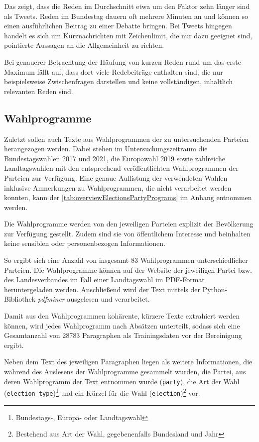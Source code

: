 Das zeigt, dass die Reden im Durchschnitt etwa um den Faktor zehn länger sind als Tweets. Reden im Bundestag dauern oft mehrere Minuten an und können so einen ausführlichen Beitrag zu einer Debatte bringen. Bei Tweets hingegen handelt es sich um Kurznachrichten mit Zeichenlimit, die nur dazu geeignet sind, pointierte Aussagen an die Allgemeinheit zu richten.

Bei genauerer Betrachtung der Häufung von kurzen Reden rund um das erste Maximum fällt auf, dass dort viele Redebeiträge enthalten sind, die nur beispielsweise Zwischenfragen darstellen und keine vollständigen, inhaltlich relevanten Reden sind.


\subsection*{Wahlprogramme}

Zuletzt sollen auch Texte aus Wahlprogrammen der zu untersuchenden Parteien herangezogen werden. Dabei stehen im Untersuchungszeitraum die Bundestagswahlen \num{2017} und \num{2021}, die Europawahl 2019 sowie zahlreiche Landtagswahlen mit den entsprechend veröffentlichten Wahlprogrammen der Parteien zur Verfügung. Eine genaue Auflistung der verwendeten Wahlen inklusive Anmerkungen zu Wahlprogrammen, die nicht verarbeitet werden konnten, kann der \autoref{tab:overviewElectionsPartyPrograms} im Anhang entnommen werden.

Die Wahlprogramme werden von den jeweiligen Parteien explizit der Bevölkerung zur Verfügung gestellt. Zudem sind sie von öffentlichem Interesse und beinhalten keine sensiblen oder personenbezogen Informationen.

So ergibt sich eine Anzahl von insgesamt \num{83} Wahlprogrammen unterschiedlicher Parteien. Die Wahlprogramme können auf der Website der jeweiligen Partei bzw. des Landesverbandes im Fall einer Landtagswahl im \ac{PDF}-Format heruntergeladen werden. Anschließend wird der Text mittels der Python-Bibliothek \textit{pdfminer} ausgelesen und verarbeitet.

Damit aus den Wahlprogrammen kohärente, kürzere Texte extrahiert werden können, wird jedes Wahlprogramm nach Absätzen unterteilt, sodass sich eine Gesamtanzahl von \num{28783} Paragraphen als Trainingsdaten vor der Bereinigung ergibt.

Neben dem Text des jeweiligen Paragraphen liegen als weitere Informationen, die während des Auslesens der Wahlprogramme gesammelt wurden, die Partei, aus deren Wahlprogramm der Text entnommen wurde (\texttt{party}), die Art der Wahl (\texttt{election\_type})\footnote{Bundestags-, Europa- oder Landtagswahl} und ein Kürzel für die Wahl (\texttt{election})\footnote{Bestehend aus Art der Wahl, gegebenenfalls Bundesland und Jahr} vor.

